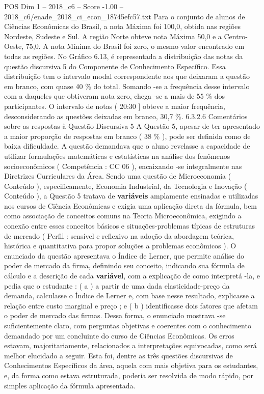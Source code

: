 \begin{textsample}{POS Dim 1 – 2018\_c6 – Score -1.00 – 2018\_c6/enade\_2018\_ci\_econ\_18745efc57.txt}
Para o conjunto de alunos de Ciências Econômicas do Brasil, a nota Máxima foi 100,0, obtida nas regiões Nordeste, Sudeste e Sul.
A região Norte obteve nota Máxima 50,0 e a Centro-Oeste, 75,0.
A nota Mínima do Brasil foi zero, o mesmo valor encontrado em todas as regiões.
No Gráfico 6.13, é representada a distribuição das notas da questão discursiva 5 do Componente de Conhecimento Específico.
Essa distribuição tem o intervalo modal correspondente aos que deixaram a questão em branco, com quase 40 \% do total.
Somando -se a frequência desse intervalo com a daqueles que obtiveram nota zero, chega -se a mais de 55 \% dos participantes.
O intervalo de notas ( 20:30 ] obteve a maior frequência, desconsiderando as questões deixadas em branco, 30,7 \%. 6.3.2.6 Comentários sobre as respostas à Questão Discursiva 5 A Questão 5, apesar de ter apresentado a maior proporção de respostas em branco ( 38 \% ), pode ser definida como de baixa dificuldade.
A questão demandava que o aluno revelasse a capacidade de utilizar formulações matemáticas e estatísticas na análise dos fenômenos socioeconômicos ( Competência : CC 06 ), encaixando -se integralmente nas Diretrizes Curriculares da Área.
Sendo uma questão de Microeconomia ( Conteúdo ), especificamente, Economia Industrial, da Tecnologia e Inovação ( Conteúdo ), a Questão 5 tratava de \textbf{variáveis} amplamente ensinadas e utilizadas nos cursos de Ciência Econômicas e exigia uma aplicação direta da fórmula, bem como associação de conceitos comuns na Teoria Microeconômica, exigindo a conexão entre esses conceitos básicos e situações-problemas típicas de estruturas de mercado ( Perfil : sensível e reflexivo na adoção da abordagem teórica, histórica e quantitativa para propor soluções a problemas econômicos ).
O enunciado da questão apresentava o Índice de Lerner, que permite análise do poder de mercado da firma, definindo seu conceito, indicando sua fórmula de cálculo e a descrição de cada \textbf{variável}, com a explicação de como interpretá -la, e pedia que o estudante : ( a ) a partir de uma dada elasticidade-preço da demanda, calculasse o Índice de Lerner e, com base nesse resultado, explicasse a relação entre custo marginal e preço ; e ( b ) identificasse dois fatores que afetam o poder de mercado das firmas.
Dessa forma, o enunciado mostrava -se suficientemente claro, com perguntas objetivas e coerentes com o conhecimento demandado por um concluinte do curso de Ciências Econômicas.
Os erros estavam, majoritariamente, relacionados a interpretações equivocadas, como será melhor elucidado a seguir.
Esta foi, dentre as três questões discursivas de Conhecimentos Específicos da área, aquela com mais objetiva para os estudantes, e, da forma como estava estruturada, poderia ser resolvida de modo rápido, por simples aplicação da fórmula apresentada.

\end{textsample}
